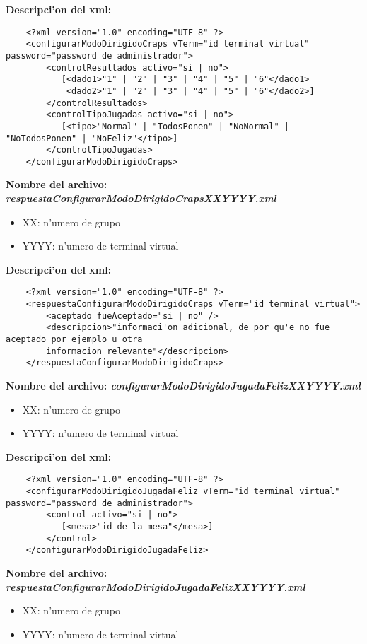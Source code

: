 \bf{Descripci'on del xml:}
\begin{verbatim}
    <?xml version="1.0" encoding="UTF-8" ?>
    <configurarModoDirigidoCraps vTerm="id terminal virtual" password="password de administrador">
        <controlResultados activo="si | no">
           [<dado1>"1" | "2" | "3" | "4" | "5" | "6"</dado1>
            <dado2>"1" | "2" | "3" | "4" | "5" | "6"</dado2>]
        </controlResultados>
        <controlTipoJugadas activo="si | no">
           [<tipo>"Normal" | "TodosPonen" | "NoNormal" | "NoTodosPonen" | "NoFeliz"</tipo>]
        </controlTipoJugadas>
    </configurarModoDirigidoCraps>
\end{verbatim}


\bf{Nombre del archivo:} \it{respuestaConfigurarModoDirigidoCrapsXXYYYY.xml}
\begin{itemize}
    \item{XX: n'umero de grupo}
    \item{YYYY: n'umero de terminal virtual}
\end{itemize}

\bf{Descripci'on del xml:}
\begin{verbatim}
    <?xml version="1.0" encoding="UTF-8" ?>
    <respuestaConfigurarModoDirigidoCraps vTerm="id terminal virtual">
        <aceptado fueAceptado="si | no" />
        <descripcion>"informaci'on adicional, de por qu'e no fue aceptado por ejemplo u otra
        informacion relevante"</descripcion>
    </respuestaConfigurarModoDirigidoCraps>
\end{verbatim}


\bf{Nombre del archivo:} \it{configurarModoDirigidoJugadaFelizXXYYYY.xml}
\begin{itemize}
    \item{XX: n'umero de grupo}
    \item{YYYY: n'umero de terminal virtual}
\end{itemize}


\bf{Descripci'on del xml:}
\begin{verbatim}
    <?xml version="1.0" encoding="UTF-8" ?>
    <configurarModoDirigidoJugadaFeliz vTerm="id terminal virtual" password="password de administrador">
        <control activo="si | no">
           [<mesa>"id de la mesa"</mesa>]
        </control>
    </configurarModoDirigidoJugadaFeliz>
\end{verbatim}


\bf{Nombre del archivo:} \it{respuestaConfigurarModoDirigidoJugadaFelizXXYYYY.xml}
\begin{itemize}
    \item{XX: n'umero de grupo}
    \item{YYYY: n'umero de terminal virtual}
\end{itemize}

